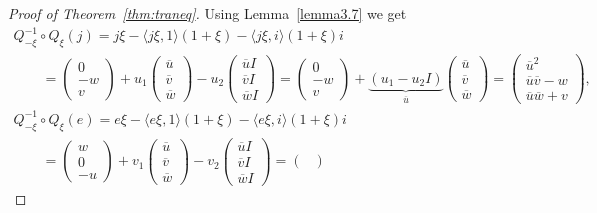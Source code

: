 \documentclass[pdftex]{sigma}
\numberwithin{equation}{section}
\begin{document}
\begin{proof}[Proof of Theorem~\ref{thm:traneq}]
Using Lemma~\ref{lemma3.7} we get
 \begin{gather*}
 Q_{-\xi}^{-1}\circ Q_\xi(j)=j \xi- \langle j \xi,1\rangle(1+\xi)- \langle j\xi ,i\rangle (1+\xi)i \\
 \qquad{}=\begin{pmatrix}
 0 \\ -w \\ v
 \end{pmatrix} + u_1
 \begin{pmatrix}
 \overline{u} \\ \overline{v} \\ \overline{w}
 \end{pmatrix}
 -u_2
 \begin{pmatrix}
 \overline{u} I \\ \overline{v} I \\ \overline{w}I
 \end{pmatrix}=
 \begin{pmatrix}
 0 \\ -w \\ v
 \end{pmatrix} + \underbrace{(u_1-u_2I)}_{\overline{u}}
 \begin{pmatrix}
 \overline{u} \\ \overline{v} \\ \overline{w}
 \end{pmatrix}=
 \begin{pmatrix}
 \overline{u}^2 \\ \overline{u}\overline{v}-w \\ \overline{u}\overline{w}+v
 \end{pmatrix},\\
 Q_{-\xi}^{-1}\circ Q_\xi(e)=e \xi- \langle e \xi,1\rangle(1+\xi)- \langle e\xi ,i\rangle (1+\xi)i \\
 \qquad{}=\begin{pmatrix}
 w \\ 0 \\ -u
 \end{pmatrix} + v_1
 \begin{pmatrix}
 \overline{u} \\ \overline{v} \\ \overline{w}
 \end{pmatrix}
 - v_2
 \begin{pmatrix}
 \overline{u} I \\ \overline{v} I \\ \overline{w}I
 \end{pmatrix}=
 \begin{pmatrix}

\end{pmatrix}
\end{gather*}
\end{proof}
\end{document}

